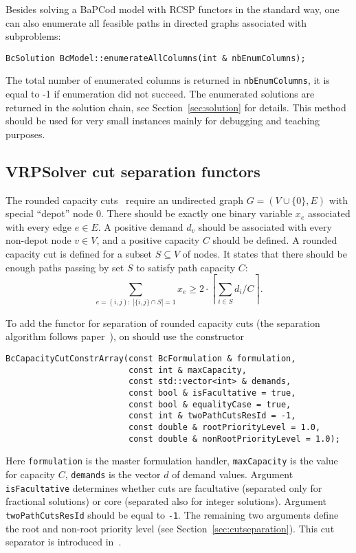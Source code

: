 \documentclass[10pt,a4paper]{article}
\newcommand{\bc}{BaPCod\xspace}
\begin{document}
Besides solving a \bc model with RCSP functors in the standard way, one can also enumerate all feasible paths in directed
graphs associated with subproblems:
\begin{lstlisting}
BcSolution BcModel::enumerateAllColumns(int & nbEnumColumns);
\end{lstlisting}
The total number of enumerated columns is returned in \verb+nbEnumColumns+, it is equal to -1 if enumeration did not
succeed. The enumerated solutions are returned in the solution chain, see Section~\ref{sec:solution} for details. This
method should be used for very small instances mainly for debugging and teaching purposes.


\subsection{VRPSolver cut separation functors}
\label{sec:vrpsolvercutseparation}

The rounded capacity cuts~\cite{LaporteNobert:83a} require an undirected graph $G=(V\cup\{0\},E)$ with special
``depot'' node $0$. There should be exactly one binary variable $x_e$ associated with every edge $e\in E$. A positive
demand $d_v$ should be associated with every non-depot node $v\in V$, and a positive capacity $C$ should be defined. A
rounded capacity cut is defined for a subset $S\subseteq V$ of nodes. It states that there should be enough paths
passing by set $S$ to satisfy path capacity $C$:
\begin{displaymath}
\sum_{e=(i,j):\;|\{i,j\}\cap S|=1} x_e\geq 2\cdot\left\lceil \sum_{i\in S}d_i/C\right\rceil.
\end{displaymath}

To add the functor for separation of rounded capacity cuts (the separation algorithm follows
paper~\cite{LysgaardLetchfordEglese:04a}), on should use the constructor 
\begin{lstlisting}
BcCapacityCutConstrArray(const BcFormulation & formulation,
                         const int & maxCapacity,
                         const std::vector<int> & demands,
                         const bool & isFacultative = true,
                         const bool & equalityCase = true,
                         const int & twoPathCutsResId = -1,
                         const double & rootPriorityLevel = 1.0,
                         const double & nonRootPriorityLevel = 1.0);
\end{lstlisting}
Here \verb+formulation+ is the master formulation handler, \verb+maxCapacity+ is the value for capacity $C$,
\verb+demands+ is the vector $d$ of demand values. Argument \verb+isFacultative+ determines whether cuts are facultative
(separated only for fractional solutions) or core (separated also for integer solutions). Argument
\verb+twoPathCutsResId+ should be equal to \verb+-1+. The remaining two arguments define the root and non-root
priority level (see Section~\ref{sec:cutseparation}). This cut separator is introduced in~\cite{PessoaSadykovUchoa:20a}.
\end{document}
